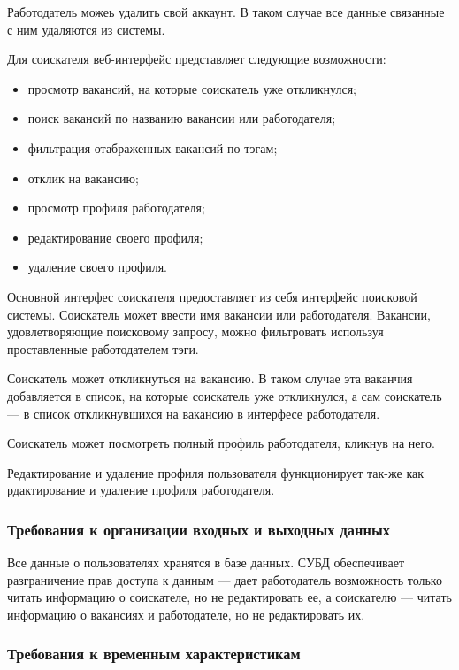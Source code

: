 \documentclass[a4page]{article}
\begin{document}
Работодатель можеь удалить свой аккаунт. В таком случае все данные связанные с ним удаляются из системы.

Для соискателя веб-интерфейс представляет следующие возможности:

\begin{itemize}
  \item просмотр вакансий, на которые соискатель уже откликнулся;
  \item поиск вакансий по названию вакансии или работодателя;
  \item фильтрация отабраженных вакансий по тэгам;
  \item отклик на вакансию;
  \item просмотр профиля работодателя;
  \item редактирование своего профиля;
  \item удаление своего профиля.
\end{itemize}

Основной интерфес соискателя предоставляет из себя интерфейс поисковой системы. Соискатель может ввести имя вакансии или работодателя. Вакансии, удовлетворяющие поисковому запросу, можно фильтровать используя проставленные работодателем тэги.

Соискатель может откликнуться на вакансию. В таком случае эта ваканчия добавляется в список, на которые соискатель уже откликнулся, а сам соискатель --- в список откликнувшихся на вакансию в интерфесе работодателя.

Соискатель может посмотреть полный профиль работодателя, кликнув на него.

Редактирование и удаление профиля пользователя функционирует так-же как рдактирование и удаление профиля работодателя.

\subsubsection{Требования к организации входных и выходных данных}

Все данные о пользователях хранятся в базе данных. СУБД обеспечивает разграничение прав доступа к данным --- дает работодатель возможность только читать информацию о соискателе, но не редактировать ее, а соискателю --- читать информацию о вакансиях и работодателе, но не редактировать их.

\subsubsection{Требования к временным характеристикам}
\end{document}
